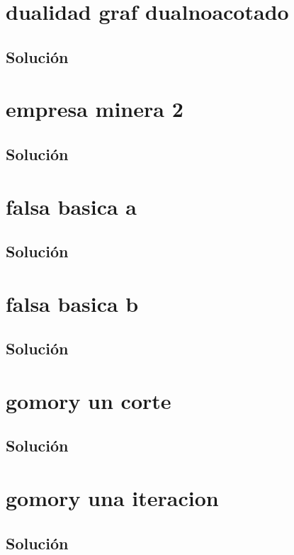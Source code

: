 \section{dualidad graf dualnoacotado}

\subsection*{Solución}

\clearpage
\section{empresa minera 2}

\subsection*{Solución}

\clearpage
\section{falsa basica a}

\subsection*{Solución}

\clearpage
\section{falsa basica b}

\subsection*{Solución}

\clearpage
\section{gomory un corte}

\subsection*{Solución}

\clearpage
\section{gomory una iteracion}

\subsection*{Solución}

\clearpage
